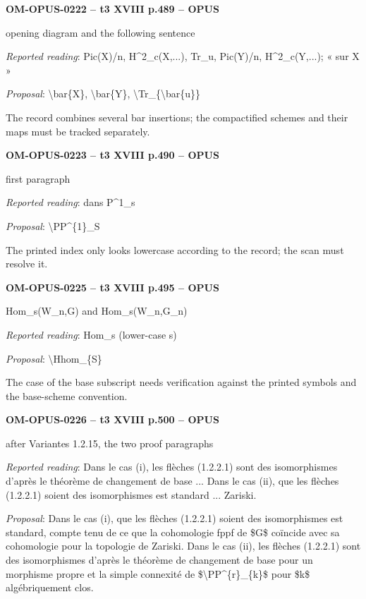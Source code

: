 \par\noindent\textbf{OM-OPUS-0222 -- t3 XVIII p.489 -- OPUS}\par
opening diagram and the following sentence\par
\emph{Reported reading}: Pic(X)/n, H\textasciicircum{}2\_c(X,...), Tr\_u, Pic(Y)/n, H\textasciicircum{}2\_c(Y,...); « sur X »\par
\emph{Proposal}: \textbackslash{}bar\{X\}, \textbackslash{}bar\{Y\}, \textbackslash{}Tr\_\{\textbackslash{}bar\{u\}\}\par
The record combines several bar insertions; the compactified schemes and their maps must be tracked separately.\par
\par\noindent\textbf{OM-OPUS-0223 -- t3 XVIII p.490 -- OPUS}\par
first paragraph\par
\emph{Reported reading}: dans P\textasciicircum{}1\_s\par
\emph{Proposal}: \textbackslash{}PP\textasciicircum{}\{1\}\_S\par
The printed index only looks lowercase according to the record; the scan must resolve it.\par
\par\noindent\textbf{OM-OPUS-0225 -- t3 XVIII p.495 -- OPUS}\par
Hom\_s(W\_n,G) and Hom\_s(W\_n,G\_n)\par
\emph{Reported reading}: Hom\_s (lower-case s)\par
\emph{Proposal}: \textbackslash{}Hhom\_\{S\}\par
The case of the base subscript needs verification against the printed symbols and the base-scheme convention.\par
\par\noindent\textbf{OM-OPUS-0226 -- t3 XVIII p.500 -- OPUS}\par
after Variantes 1.2.15, the two proof paragraphs\par
\emph{Reported reading}: Dans le cas (i), les flèches (1.2.2.1) sont des isomorphismes d'après le théorème de changement de base ... Dans le cas (ii), que les flèches (1.2.2.1) soient des isomorphismes est standard ... Zariski.\par
\emph{Proposal}: Dans le cas (i), que les flèches (1.2.2.1) soient des isomorphismes est standard, compte tenu de ce que la cohomologie fppf de \$G\$ coïncide avec sa cohomologie pour la topologie de Zariski. Dans le cas (ii), les flèches (1.2.2.1) sont des isomorphismes d'après le théorème de changement de base pour un morphisme propre et la simple connexité de \$\textbackslash{}PP\textasciicircum{}\{r\}\_\{k\}\$ pour \$k\$ algébriquement clos.\par
